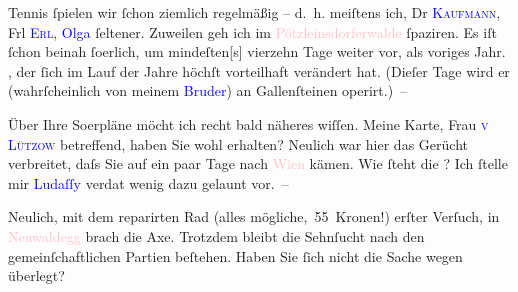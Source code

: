 \pstart
           Tennis ſpielen wir ſchon ziemlich regelmäßig – d. h. meiſtens ich, Dr \textsc{\textcolor{blue}{Kaufmann}{}\ledrightnote{\textcolor{blue}{Arthur Kaufmann}}}, Frl \textsc{\textcolor{blue}{Erl}{}\ledrightnote{\textcolor{blue}{Dora Erl}}}, \textcolor{blue}{Olga}{}\ledrightnote{\textcolor{blue}{Olga Schnitzler}} ſeltener. Zuweilen geh ich im \textcolor{pink}{Pötzleinsdorferwalde}{}\ledrightnote{\textcolor{pink}{Pötzleinsdorf}} ſpaziren. Es iſt ſchon beinah
                  ſo{\geminationm}erlich, um mindeſten{[}s{]}
               vierzehn Tage weiter vor, als voriges Jahr. \label{K_L03004-1v}\label{K_L03004-1h}, der ſich im Lauf der Jahre höchſt vorteilhaft verändert hat. (Dieſer {\pb}Tage wird er (wahrſcheinlich von meinem \textcolor{blue}{Bruder}{}\ledrightnote{{$\rightarrow$}\textcolor{blue}{Julius Schnitzler}}) an Gallenſteinen
               operirt.) –\pend
           
\pstart
           Über Ihre So{\geminationm}erpläne möcht ich recht bald näheres
               wiſſen. Meine Karte, Frau \textsc{\textcolor{blue}{v Lützow}{}\ledrightnote{\textcolor{blue}{Linda von Lützow}}} betreffend, haben Sie wohl erhalten? Neulich war hier das Gerücht verbreitet,
               daſs Sie auf ein paar Tage nach \textcolor{pink}{Wien}{}\ledrightnote{\textcolor{pink}{Wien}} kämen. Wie
               ſteht die \label{K_L03004-2v}\label{K_L03004-2h}? Ich ſtelle mir \textcolor{blue}{Ludaſſy}{}\ledrightnote{\textcolor{blue}{Julius von Gans-Ludassy}} verda{\geminationm}t wenig dazu gelaunt vor. –\pend
           
\pstart
           Neulich, mit dem reparirten Rad (alles mögliche, 55 Kronen!) erſter Verſuch, in \textcolor{pink}{Neuwaldegg}{}\ledrightnote{\textcolor{pink}{Neuwaldegg}} brach die Axe. Trotzdem bleibt die
               Sehnſucht nach den gemeinſchaftlichen Partien beſtehen. Haben Sie ſich nicht die
               Sache wegen \label{K_L03004-3v}\label{K_L03004-3h}{ }{\pb}überlegt?\pend
           
